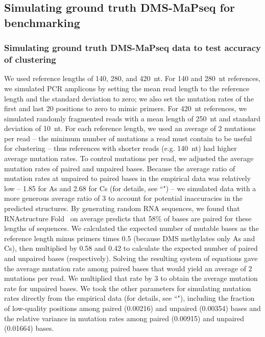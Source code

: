 \documentclass[11pt]{article}
\begin{document}
\subsection{Simulating ground truth DMS-MaPseq for benchmarking}

\subsubsection{Simulating ground truth DMS-MaPseq data to test accuracy of clustering}
\label{sim-accuracy}

We used reference lengths of 140, 280, and 420~nt.
For 140 and 280~nt references, we simulated PCR amplicons by setting the mean read length to the reference length and the standard deviation to zero; we also set the mutation rates of the first and last 20 positions to zero to mimic primers.
For 420~nt references, we simulated randomly fragmented reads with a mean length of 250~nt and standard deviation of 10~nt.
For each reference length, we used an average of 2 mutations per read -- the minimum number of mutations a read must contain to be useful for clustering -- thus references with shorter reads (e.g. 140~nt) had higher average mutation rates.
To control mutations per read, we adjusted the average mutation rates of paired and unpaired bases.
Because the average ratio of mutation rates at unpaired to paired bases in the empirical data was relatively low -- 1.85 for As and 2.68 for Cs (for details, see ``") -- we simulated data with a more generous average ratio of 3 to account for potential inaccuracies in the predicted structures.
By generating random RNA sequences, we found that RNAstructure Fold~\cite{Reuter2010} on average predicts that 58\% of bases are paired for these lengths of sequences.
We calculated the expected number of mutable bases as the reference length minus primers times 0.5 (because DMS methylates only As and Cs), then multiplied by 0.58 and 0.42 to calculate the expected number of paired and unpaired bases (respectively).
Solving the resulting system of equations gave the average mutation rate among paired bases that would yield an average of 2 mutations per read.
We multiplied that rate by 3 to obtain the average mutation rate for unpaired bases.
We took the other parameters for simulating mutation rates directly from the empirical data (for details, see ``"), including the fraction of low-quality positions among paired (0.00216) and unpaired (0.00354) bases and the relative variance in mutation rates among paired (0.00915) and unpaired (0.01664) bases.
\end{document}

